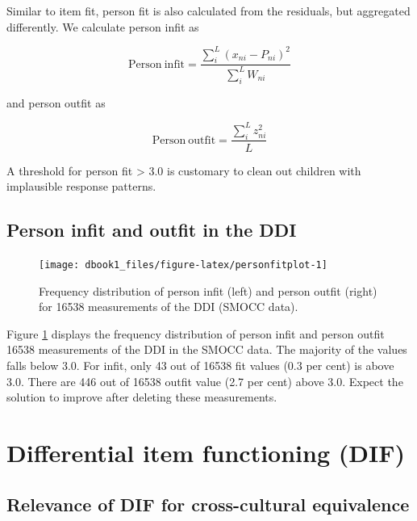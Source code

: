 \documentclass[
]{book}
\begin{document}
Similar to item fit, person fit is also calculated from the residuals, but aggregated differently. We calculate person infit as

\[\mathrm{Person\ infit} = \frac{\sum_{i}^L (x_{ni}-P_{ni})^2}{\sum_i^L W_{ni}}\]

and person outfit as

\[\mathrm{Person\ outfit} = \frac{\sum_{i}^L z_{ni}^2}{L}\]

A threshold for person fit \textgreater{} 3.0 is customary to clean out children with implausible response patterns.

\hypertarget{person-infit-and-outfit-in-the-ddi}{%
\subsection{Person infit and outfit in the DDI}\label{person-infit-and-outfit-in-the-ddi}}

\begin{figure}

{\centering \texttt{[image: dbook1\_files/figure-latex/personfitplot-1]} 

}

\caption{Frequency distribution of person infit (left) and person outfit (right) for 16538 measurements of the DDI (SMOCC data).}\label{fig:personfitplot}
\end{figure}



Figure \ref{fig:personfitplot} displays the frequency distribution of person infit and person outfit 16538 measurements of the DDI in the SMOCC data. The majority of the values falls below 3.0. For infit, only 43 out of 16538 fit values (0.3 per cent) is above 3.0. There are 446 out of 16538 outfit value (2.7 per cent) above 3.0. Expect the solution to improve after deleting these measurements.

\hypertarget{sec:dif}{%
\section{Differential item functioning (DIF)}\label{sec:dif}}

\hypertarget{relevance-of-dif-for-cross-cultural-equivalence}{%
\subsection{Relevance of DIF for cross-cultural equivalence}\label{relevance-of-dif-for-cross-cultural-equivalence}}
\end{document}
